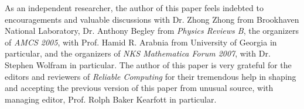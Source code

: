 \documentclass[twoside]{article}
\numberwithin{equation}{section}
\begin{document}
As an independent researcher, the author of this paper feels indebted to encouragements and valuable discussions with Dr. Zhong Zhong from Brookhaven National Laboratory, Dr. Anthony Begley from \emph{Physics Reviews B}, the organizers of \emph{AMCS 2005}, with Prof. Hamid R. Arabnia from University of Georgia in particular, and the organizers of \emph{NKS Mathematica Forum 2007}, with Dr. Stephen Wolfram in particular. 
The author of this paper is very grateful for the editors and reviewers of \emph{Reliable Computing} for their tremendous help in shaping and accepting the previous version of this paper from unusual source, with managing editor, Prof. Rolph Baker Kearfott in particular.





\end{document}
